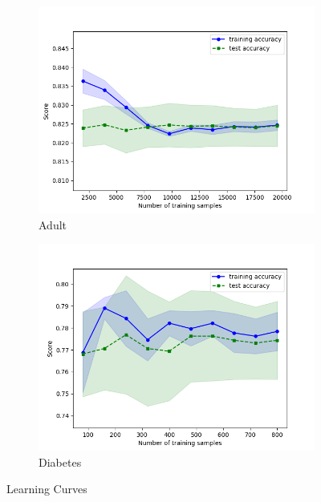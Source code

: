 \documentclass[11pt, twocolumn]{article}
\begin{document}
    \begin{figure}[!htbp]
        \begin{subfigure}{.24\textwidth}
            \centering
            \includegraphics[width=.9\textwidth]{learnings_Adult_SVC_Linear_optimized}
            \caption{Adult}
            \label{fig:learnings_Adult_SVC_Linear_optimized}
        \end{subfigure}
        \begin{subfigure}{.24\textwidth}
            \centering
            \includegraphics[width=.9\textwidth]{learnings_Diabetes_SVC_Linear_optimized}
            \caption{Diabetes}
            \label{fig:learnings_Diabetes_SVC_Linear_optimized}
        \end{subfigure}
        \caption{Learning Curves}
    \end{figure}
    \FloatBarrier
\end{document}
